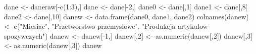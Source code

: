 \documentclass[
]{article}
\newenvironment{Shaded}{\begin{snugshade}}{\end{snugshade}}
\newcommand{\DecValTok}[1]{\textcolor[rgb]{0.00,0.00,0.81}{#1}}
\newcommand{\FunctionTok}[1]{\textcolor[rgb]{0.00,0.00,0.00}{#1}}
\newcommand{\NormalTok}[1]{#1}
\newcommand{\OtherTok}[1]{\textcolor[rgb]{0.56,0.35,0.01}{#1}}
\newcommand{\SpecialCharTok}[1]{\textcolor[rgb]{0.00,0.00,0.00}{#1}}
\newcommand{\StringTok}[1]{\textcolor[rgb]{0.31,0.60,0.02}{#1}}
\begin{document}
\begin{Shaded}
\begin{Highlighting}[]
\NormalTok{dane }\OtherTok{\textless{}{-}}\NormalTok{ daneraw[}\SpecialCharTok{{-}}\FunctionTok{c}\NormalTok{(}\DecValTok{1}\SpecialCharTok{:}\DecValTok{3}\NormalTok{),]}
\NormalTok{dane }\OtherTok{\textless{}{-}}\NormalTok{ dane[}\SpecialCharTok{{-}}\DecValTok{2}\NormalTok{,]}
\NormalTok{dane0 }\OtherTok{\textless{}{-}}\NormalTok{ dane[,}\DecValTok{1}\NormalTok{]}
\NormalTok{dane1 }\OtherTok{\textless{}{-}}\NormalTok{ dane[,}\DecValTok{8}\NormalTok{]}
\NormalTok{dane2 }\OtherTok{\textless{}{-}}\NormalTok{ dane[,}\DecValTok{10}\NormalTok{]}
\NormalTok{danew }\OtherTok{\textless{}{-}} \FunctionTok{data.frame}\NormalTok{(dane0, dane1, dane2)}
\FunctionTok{colnames}\NormalTok{(danew) }\OtherTok{\textless{}{-}} \FunctionTok{c}\NormalTok{(}\StringTok{"Miesiac"}\NormalTok{, }\StringTok{"Przetworstwo przemyslowe"}\NormalTok{, }\StringTok{"Produkcja artykulow spozywczych"}\NormalTok{)}
\NormalTok{danew }\OtherTok{\textless{}{-}}\NormalTok{ danew[}\SpecialCharTok{{-}}\DecValTok{1}\NormalTok{,]}
\NormalTok{danew[,}\DecValTok{2}\NormalTok{] }\OtherTok{\textless{}{-}} \FunctionTok{as.numeric}\NormalTok{(danew[,}\DecValTok{2}\NormalTok{])}
\NormalTok{danew[,}\DecValTok{3}\NormalTok{] }\OtherTok{\textless{}{-}} \FunctionTok{as.numeric}\NormalTok{(danew[,}\DecValTok{3}\NormalTok{])}
\NormalTok{danew}
\end{Highlighting}
\end{Shaded}
\end{document}
